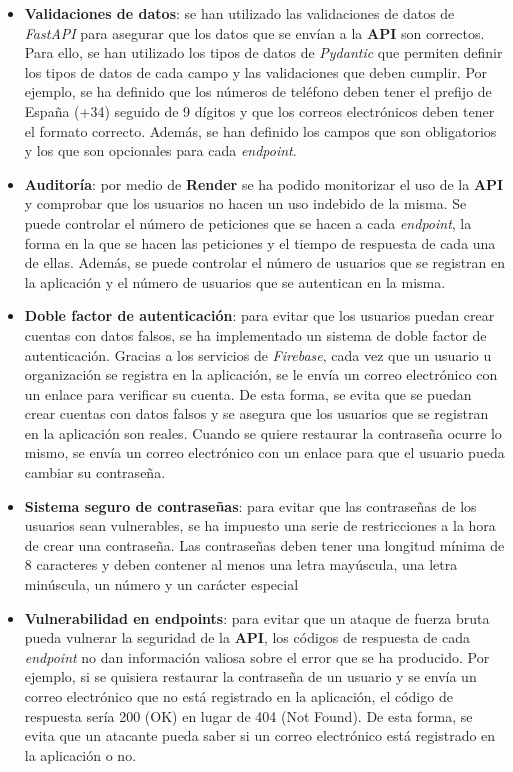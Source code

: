 \begin{itemize}
    \item \textbf{Validaciones de datos}: se han utilizado las validaciones de datos de \textit{FastAPI} para asegurar que los datos
    que se envían a la \textbf{API} son correctos. Para ello, se han utilizado los tipos de datos de \textit{Pydantic} que permiten
    definir los tipos de datos de cada campo y las validaciones que deben cumplir. Por ejemplo, se ha definido que
    los números de teléfono deben tener el prefijo de España (+34) seguido de 9 dígitos y que los correos electrónicos deben tener el formato
    correcto. Además, se han definido los campos que son obligatorios y los que son opcionales para cada \textit{endpoint}.
    \item \textbf{Auditoría}: por medio de \textbf{Render} se ha podido monitorizar el uso de la \textbf{API} y comprobar que los usuarios
    no hacen un uso indebido de la misma. Se puede controlar el número de peticiones que se hacen a cada \textit{endpoint},
    la forma en la que se hacen las peticiones y el tiempo de respuesta de cada una de ellas. Además, se puede controlar
    el número de usuarios que se registran en la aplicación y el número de usuarios que se autentican en la misma.
    \item \textbf{Doble factor de autenticación}: para evitar que los usuarios puedan crear cuentas con datos falsos, se ha
    implementado un sistema de doble factor de autenticación. Gracias a los servicios de \textit{Firebase}, cada vez que
    un usuario u organización se registra en la aplicación, se le envía un correo electrónico con un enlace para verificar
    su cuenta. De esta forma, se evita que se puedan crear cuentas con datos falsos y se asegura que los usuarios
    que se registran en la aplicación son reales. Cuando se quiere restaurar la contraseña ocurre lo mismo, se envía
    un correo electrónico con un enlace para que el usuario pueda cambiar su contraseña.
    \item \textbf{Sistema seguro de contraseñas}: para evitar que las contraseñas de los usuarios sean vulnerables, se ha
    impuesto una serie de restricciones a la hora de crear una contraseña. Las contraseñas deben tener una longitud mínima
    de 8 caracteres y deben contener al menos una letra mayúscula, una letra minúscula, un número y un carácter especial
    \item \textbf{Vulnerabilidad en endpoints}: para evitar que un ataque de fuerza bruta pueda vulnerar la seguridad de la \textbf{API},
    los códigos de respuesta de cada \textit{endpoint} no dan información valiosa sobre el error que se ha producido. Por ejemplo,
    si se quisiera restaurar la contraseña de un usuario y se envía un correo electrónico que no está registrado en la
    aplicación, el código de respuesta sería 200 (OK) en lugar de 404 (Not Found). De esta forma, se evita que un atacante
    pueda saber si un correo electrónico está registrado en la aplicación o no.
\end{itemize}


